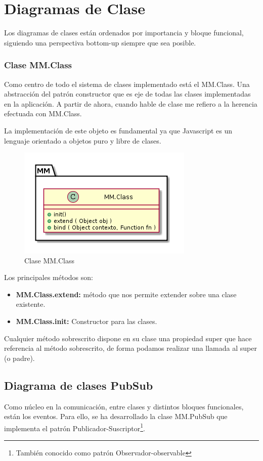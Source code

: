 \section{Diagramas de Clase}

Los diagramas de clases están ordenados por importancia y bloque funcional, siguiendo una
perspectiva bottom-up siempre que sea posible.


\subsubsection{Clase MM.Class}
Como centro de todo el sistema de clases implementado está el MM.Class. Una abstracción del 
patrón constructor que es eje de todas las clases implementadas en la aplicación. A partir 
de ahora, cuando hable de clase me refiero a la herencia efectuada con MM.Class.

La implementación de este objeto es fundamental ya que Javascript es un lenguaje orientado 
a objetos puro y libre de clases. 

\begin{figure}[tbph]
\centering
\includegraphics[width=0.4\linewidth]{imagenes/diagrama-clase-mm-class}
\caption{Clase MM.Class}
\label{fig:diagrama-clase-mm-class}
\end{figure}
Los principales métodos son:   
\begin{itemize}
\item \textbf{MM.Class.extend:} método que nos permite extender sobre una clase existente.
\item \textbf{MM.Class.init:} Constructor para las clases.
\end{itemize}

Cualquier método sobrescrito dispone en su clase una propiedad \underline{ }super que hace referencia al método sobrescrito, de forma
podamos realizar una llamada al super (o padre).


\subsection{Diagrama de clases PubSub}

Como núcleo en la comunicación, entre clases y distintos bloques funcionales, están los eventos. Para ello, se ha desarrollado
la clase MM.PubSub que implementa el patrón Publicador-Suscriptor\footnote{También conocido como patrón Observador-observable}.


